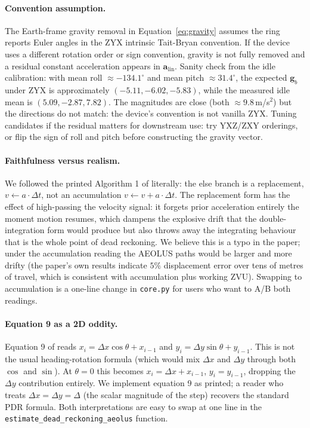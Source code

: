 \documentclass[a4paper,11pt]{article}
\begin{document}
\paragraph{Convention assumption.}
The Earth-frame gravity removal in Equation~\ref{eq:gravity} assumes the ring
reports Euler angles in the ZYX intrinsic Tait-Bryan convention. If the
device uses a different rotation order or sign convention, gravity is not
fully removed and a residual constant acceleration appears in
$\mathbf{a}_{\mathrm{lin}}$. Sanity check from the idle calibration: with
mean roll $\approx -134.1^\circ$ and mean pitch $\approx 31.4^\circ$, the
expected $\mathbf{g}_b$ under ZYX is approximately $(-5.11, -6.02, -5.83)$,
while the measured idle mean is $(5.09, -2.87, 7.82)$. The magnitudes are
close (both $\approx 9.8$\,m/s$^2$) but the directions do not match: the
device's convention is not vanilla ZYX. Tuning candidates if the residual
matters for downstream use: try YXZ/ZXY orderings, or flip the sign of roll
and pitch before constructing the gravity vector.

\paragraph{Faithfulness versus realism.}
We followed the printed Algorithm 1 of \cite{radeta2023} literally: the else
branch is a replacement, $v \gets a \cdot \Delta t$, not an accumulation
$v \gets v + a \cdot \Delta t$. The replacement form has the effect of
high-passing the velocity signal: it forgets prior acceleration entirely the
moment motion resumes, which dampens the explosive drift that the
double-integration form would produce but also throws away the integrating
behaviour that is the whole point of dead reckoning. We believe this is a
typo in the paper; under the accumulation reading the AEOLUS paths would be
larger and more drifty (the paper's own results indicate $5\%$ displacement
error over tens of metres of travel, which is consistent with accumulation
plus working ZVU). Swapping to accumulation is a one-line change in
\texttt{core.py} for users who want to A/B both readings.

\paragraph{Equation 9 as a 2D oddity.}
Equation 9 of \cite{radeta2023} reads $x_i = \Delta x \cos\theta + x_{i-1}$
and $y_i = \Delta y \sin\theta + y_{i-1}$. This is not the usual
heading-rotation formula (which would mix $\Delta x$ and $\Delta y$ through
both $\cos$ and $\sin$). At $\theta = 0$ this becomes $x_i = \Delta x +
x_{i-1}$, $y_i = y_{i-1}$, dropping the $\Delta y$ contribution entirely. We
implement equation 9 as printed; a reader who treats $\Delta x = \Delta y =
\Delta$ (the scalar magnitude of the step) recovers the standard PDR
formula. Both interpretations are easy to swap at one line in the
\texttt{estimate\_dead\_reckoning\_aeolus} function.
\end{document}
